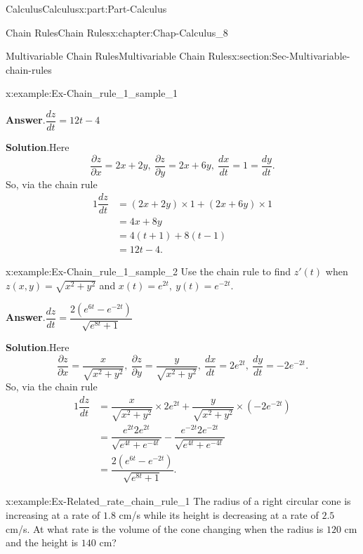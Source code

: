 \documentclass[oneside,10pt,]{book}
\newcommand{\blocktitlefont}{\relax}
\numberwithin{equation}{section}
\newcommand{\amp}{&}
\begin{document}
\begin{partptx}{Calculus}{}{Calculus}{}{}{x:part:Part-Calculus}
\begin{chapterptx}{Chain Rules}{}{Chain Rules}{}{}{x:chapter:Chap-Calculus_8}
\begin{sectionptx}{Multivariable Chain Rules}{}{Multivariable Chain Rules}{}{}{x:section:Sec-Multivariable-chain-rules}
\begin{example}{}{x:example:Ex-Chain_rule_1_sample_1}
\par\smallskip%
\noindent\textbf{\blocktitlefont Answer}.\hypertarget{g:answer:id553601}{}\quad{}\(\dfrac{dz}{dt} = 12t-4\)%
\par\smallskip%
\noindent\textbf{\blocktitlefont Solution}.\hypertarget{g:solution:id553605}{}\quad{}Here%
\begin{equation*}
\dfrac{\partial z}{\partial x} = 2x + 2y, \ \dfrac{\partial z}{\partial y} = 2x + 6y, \ \dfrac{dx}{dt} = 1 = \dfrac{dy}{dt}.
\end{equation*}
So, via the chain rule%
\begin{alignat*}{1}
\dfrac{dz}{dt} \amp = (2x+2y)\times 1 + (2x+6y)\times 1\\
\quad \amp = 4x+8y\\
\quad \amp = 4(t+1)+8(t-1)\\
\quad \amp = 12t-4.
\end{alignat*}
%
\end{example}
\begin{example}{}{x:example:Ex-Chain_rule_1_sample_2}%
Use the chain rule to find \(z'(t)\) when \(z(x,y) = \sqrt{x^2+y^2}\) and \(x(t) = e^{2t}, \ y(t)=e^{-2t}\).%
\par\smallskip%
\noindent\textbf{\blocktitlefont Answer}.\hypertarget{g:answer:id553610}{}\quad{}\(\dfrac{dz}{dt} = \dfrac{2(e^{6t} - e^{-2t})}{\sqrt{e^{8t}+1}}\)%
\par\smallskip%
\noindent\textbf{\blocktitlefont Solution}.\hypertarget{g:solution:id553625}{}\quad{}Here%
\begin{equation*}
\dfrac{\partial z}{\partial x} = \dfrac{x}{\sqrt{x^2+y^2}}, \ \dfrac{\partial z}{\partial y} = \dfrac{y}{\sqrt{x^2+y^2}}, \ \dfrac{dx}{dt} = 2e^{2t}, \ \dfrac{dy}{dt} = -2e^{-2t}.
\end{equation*}
So, via the chain rule%
\begin{alignat*}{1}
\dfrac{dz}{dt} \amp = \dfrac{x}{\sqrt{x^2+y^2}}\times 2e^{2t} + \dfrac{y}{\sqrt{x^2+y^2}}\times (-2e^{-2t})\\
\quad \amp = \dfrac{e^{2t}2e^{2t}}{\sqrt{e^{4t} + e^{-4t}}} -\dfrac{e^{-2t}2e^{-2t}}{\sqrt{e^{4t} + e^{-4t}}}\\
\quad \amp = \dfrac{2(e^{6t} - e^{-2t})}{\sqrt{e^{8t}+1}}.
\end{alignat*}
%
\end{example}
\begin{example}{}{x:example:Ex-Related_rate_chain_rule_1}%
The radius of a right circular cone is increasing at a rate of \(1.8\) cm\slash{}s while its height is decreasing at a rate of \(2.5\) cm\slash{}s. At what rate is the volume of the cone changing when the radius is \(120\) cm and the height is \(140\) cm?%

\end{example}
\end{sectionptx}
\end{chapterptx}
\end{partptx}
\end{document}
